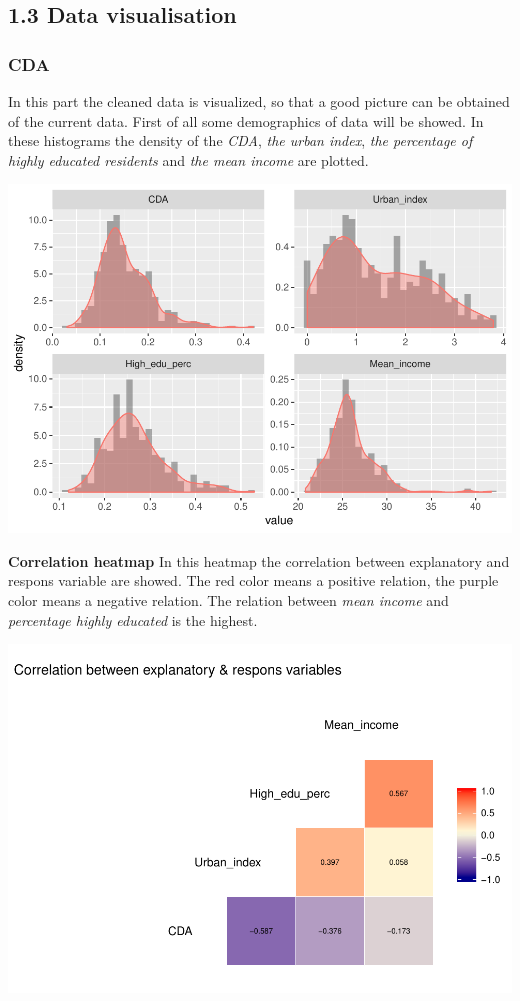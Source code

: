 \documentclass[11pt,]{article}
\begin{document}
\subsection{1.3 Data visualisation}\label{data-visualisation}

\subsubsection{CDA}\label{cda}

In this part the cleaned data is visualized, so that a good picture can
be obtained of the current data. First of all some demographics of data
will be showed. In these histograms the density of the \emph{CDA},
\emph{the urban index}, \emph{the percentage of highly educated
residents} and \emph{the mean income} are plotted.

\begin{center}\includegraphics{Report_files/figure-latex/demographics_data-1} \end{center}

\textbf{Correlation heatmap} In this heatmap the correlation between
explanatory and respons variable are showed. The red color means a
positive relation, the purple color means a negative relation. The
relation between \emph{mean income} and \emph{percentage highly
educated} is the highest.

\begin{center}\includegraphics{Report_files/figure-latex/correlation_heatmap-1} \end{center}
\end{document}

